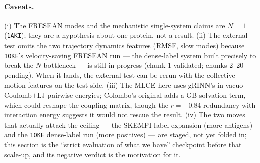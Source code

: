 \paragraph{Caveats.} (i) The FRESEAN modes and the mechanistic single-system claims are $N=1$
(\texttt{1AKI}); they are a hypothesis about one protein, not a result. (ii) The external test omits the two
trajectory dynamics features (RMSF, slow modes) because \texttt{1OKE}'s velocity-saving FRESEAN run --- the
dense-label system built precisely to break the $N$ bottleneck --- is still in progress (chunk 1 validated;
chunks 2--20 pending). When it lands, the external test can be rerun with the collective-motion features on
the test side. (iii) The MLCE here uses gRINN's in-vacuo Coulomb$+$LJ pairwise energies; Colombo's original
adds a GB solvation term, which could reshape the coupling matrix, though the $r=-0.84$ redundancy with
interaction energy suggests it would not rescue the result. (iv) The two moves that actually attack the
ceiling --- the SKEMPI label expansion (more antigens) and the \texttt{1OKE} dense-label run (more positives)
--- are staged, not yet folded in; this section is the ``strict evaluation of what we have'' checkpoint before
that scale-up, and its negative verdict is the motivation for it.
